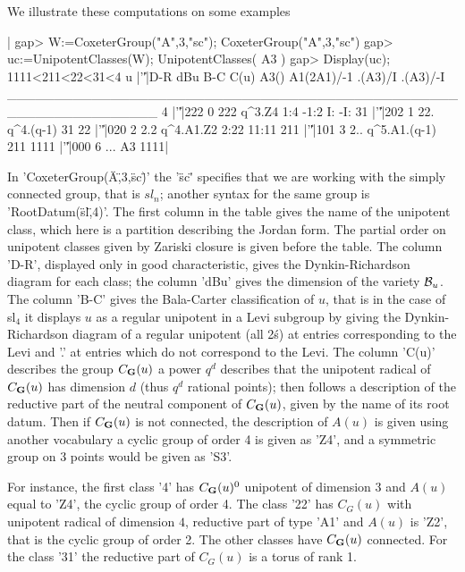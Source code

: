 We illustrate these computations on some examples\:

|    gap> W:=CoxeterGroup("A",3,"sc");
    CoxeterGroup("A",3,"sc")
    gap> uc:=UnipotentClasses(W);
    UnipotentClasses( A3 )
    gap> Display(uc);
    1111<211<22<31<4
       u |'\|'|D-R dBu B-C         C(u) A3() A1(2A1)/-1 .(A3)/I .(A3)/-I
    ________________________________________________________________
    4    |'\|'|222   0 222       q^3.Z4  1:4       -1:2      I:      -I:
    31   |'\|'|202   1 22.    q^4.(q-1)   31
    22   |'\|'|020   2 2.2    q^4.A1.Z2 2:22      11:11
    211  |'\|'|101   3 2.. q^5.A1.(q-1)  211
    1111 |'\|'|000   6 ...           A3 1111|

In  'CoxeterGroup(\"A\",3,\"sc\")'  the  '\"sc\"'  specifies  that  we  are
working with the simply connected group, that is $sl_n$; another syntax for
the  same group  is 'RootDatum(\"sl\",4)'.  The first  column in  the table
gives the name of the unipotent class, which here is a partition describing
the  Jordan form. The  partial order on  unipotent classes given by Zariski
closure is given before the table. The column 'D-R', displayed only in good
characteristic,  gives the  Dynkin-Richardson diagram  for each  class; the
column  'dBu' gives the dimension of  the variety ${\mathcal B}_u$. The column 'B-C'
gives  the Bala-Carter classification of $u$, that is in the case of sl$_4$
it  displays $u$ as  a regular unipotent  in a Levi  subgroup by giving the
Dynkin-Richardson  diagram  of  a  regular  unipotent (all 2\'s) at entries
corresponding to the Levi and '.' at entries which do not correspond to the
Levi.  The column  'C(u)' describes  the group  $C_{\bf G}(u)$\: a  power $q^d$
describes  that the unipotent radical of $C_{\bf G}(u)$ has dimension $d$ (thus
$q^d$ rational points); then follows a description of the reductive part of
the  neutral component of $C_{\bf G}(u)$, given by  the name of its root datum.
Then  if $C_{\bf G}(u)$  is not  connected, the  description of $A(u)$ is given
using another vocabulary\: a cyclic group of order 4 is given as 'Z4', and a
symmetric group on 3 points would be given as 'S3'.

For  instance, the first class '4'  has $C_{\bf G}(u)^0$ unipotent of dimension
$3$  and $A(u)$ equal to 'Z4', the cyclic  group of order 4. The class '22'
has  $C_G(u)$ with  unipotent radical  of dimension  $4$, reductive part of
type  'A1' and  $A(u)$ is  'Z2', that  is the  cyclic group of order 2. The
other  classes have $C_{\bf G}(u)$ connected. For  the class '31' the reductive
part of $C_G(u)$ is a torus of rank 1.

